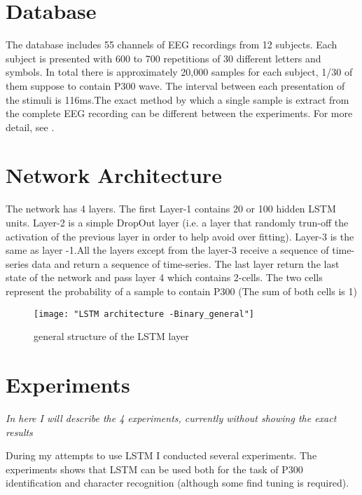 \documentclass[]{report}
\begin{document}
\section{Database}


The database includes 55 channels of EEG recordings from 12 subjects. Each subject is presented with 600 to 700 repetitions of 30 different letters and symbols. In total there is approximately 20,000 samples for each subject, 1/30 of them suppose to contain P300 wave. The interval between each presentation of the stimuli is 116ms.The exact method by which a single sample is extract from the complete EEG recording can be different between the experiments. For more detail, see \cite{Blankertz}.


\section{Network Architecture} \label{netarch}
The network has 4 layers. The first Layer-1 contains 20 or 100 hidden LSTM units. Layer-2 is a simple DropOut layer (i.e. a layer that randomly trun-off the activation of the previous layer in order to help avoid over fitting). Layer-3 is the same as layer -1.All the layers except from the layer-3 receive a sequence of time-series data and return a sequence of time-series. The last layer return the last state of the network and pass layer 4 which contains 2-cells. The two cells represent the probability of a sample to contain P300 (The sum of both cells is 1)

\begin{figure*}[h]
	\texttt{[image: "LSTM architecture -Binary\_general"]}
	\caption{general structure of the LSTM layer}
	\label{fig:RSVP}
\end{figure*}



\section{Experiments}



\textit{In here I will describe the 4 experiments, currently without showing the exact results}




During my attempts to use LSTM I conducted several experiments. The experiments shows that LSTM can be used both for the task of P300 identification and character recognition (although some find tuning is required). 
\end{document}
